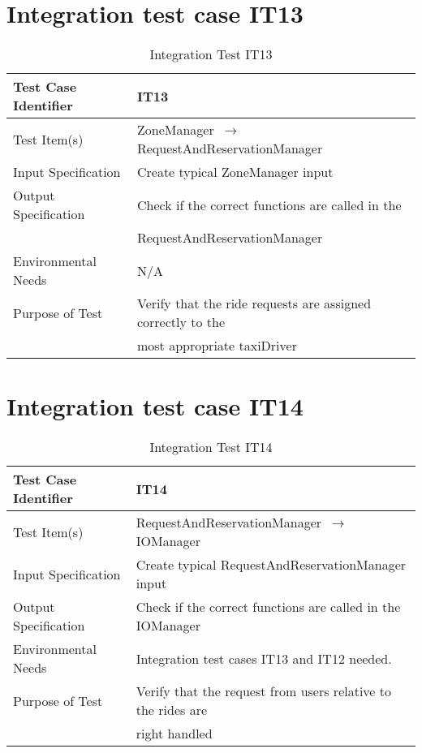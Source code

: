 \documentclass[../../testPlan.tex]{subfiles}
\begin{document}
		
	\section{Integration test case IT13}
		\begin{table}[H]
			\centering
			\label{IT13}
			\begin{tabular}{ll}
				\hline
				Test Case Identifier & IT13 \\ \hline
				Test Item(s)         & ZoneManager $\,\to\,$ RequestAndReservationManager\\ \hline
				Input Specification  & Create typical ZoneManager input  \\ \hline
				Output Specification & Check if the correct functions are called in the  \\ & RequestAndReservationManager\\ \hline
				Environmental Needs  &  N/A \\ \hline
				Purpose of Test      &  Verify that the ride requests are assigned correctly to the \\ & most appropriate taxiDriver \\ \hline
			\end{tabular}
			\caption{Integration Test IT13}
		\end{table}
		
		
	\section{Integration test case IT14}
		\begin{table}[H]
			\centering
			\label{IT14}
			\begin{tabular}{ll}
				\hline
				Test Case Identifier & IT14 \\ \hline
				Test Item(s)         & RequestAndReservationManager $\,\to\,$ IOManager\\ \hline
				Input Specification  & Create typical RequestAndReservationManager input  \\ \hline
				Output Specification & Check if the correct functions are called in the IOManager\\ \hline
				Environmental Needs  &  Integration test cases IT13 and IT12 needed. \\ \hline
				Purpose of Test      &  Verify that the request from users relative to the rides are \\ & right handled  \\ \hline
			\end{tabular}
			\caption{Integration Test IT14}
		\end{table}
		
\end{document}
